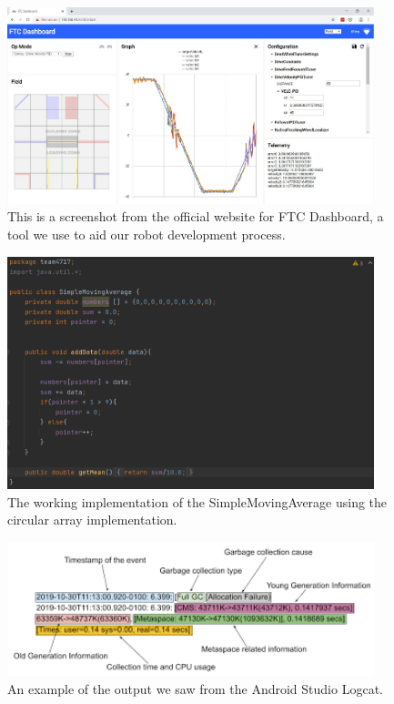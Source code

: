 \begin{figure}[htp]
\centering
\includegraphics[width=0.95\textwidth, angle=0]{Meetings/March/03-10-22/03-10-22 1.jpg}
\caption{This is a screenshot from the official website for FTC Dashboard, a tool we use to aid our robot development process.}
\label{fig:031022_1}
\end{figure}

\begin{figure}[htp]
\centering
\includegraphics[width=0.95\textwidth, angle=0]{Meetings/March/03-10-22/03-10-22 2.png}
\caption{The working implementation of the SimpleMovingAverage using the circular array implementation.}
\label{fig:031022_2}
\end{figure}

\begin{figure}[htp]
\centering
\includegraphics[width=0.95\textwidth, angle=0]{Meetings/March/03-10-22/03-10-22 3.png}
\caption{An example of the output we saw from the Android Studio Logcat.}
\label{fig:031022_3}
\end{figure}





